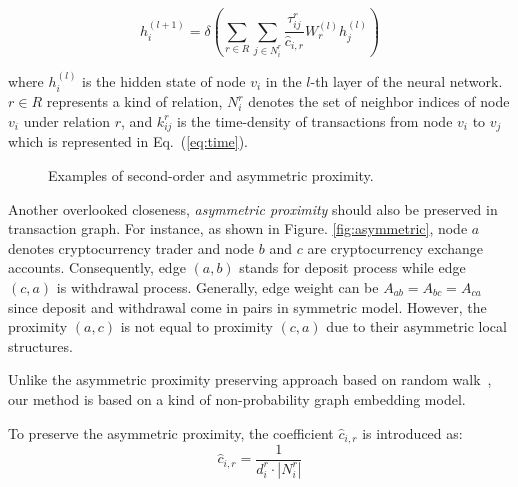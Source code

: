 \begin{equation}
h_i^{(l+1)}=\delta(\sum_{r\in R} \sum_{j \in N_i^r} \frac{\tau_{ij}^r}{\hat c_{i,r}}W_r^{(l)}h_j^{(l)})
\end{equation}

\noindent where $h_i^{(l)}$ is the hidden state of node $v_i$ in the $l$-th layer of the neural network. $r \in R$ represents a kind of relation, $N_i^r$ denotes the set of neighbor indices of node $v_i$ under relation $r$, and $k_{ij}^r$ is the time-density of transactions from node $v_i$ to $v_j$ which is represented in Eq.~(\ref{eq:time}).



\begin{figure}[htbp]
	\centering
	\caption{Examples of second-order and asymmetric proximity.}

\end{figure}


Another overlooked closeness, \emph{asymmetric proximity} should also be preserved in transaction graph. For instance, as shown in Figure. \ref{fig:asymmetric}, node $a$ denotes cryptocurrency trader and node $b$ and $c$ are cryptocurrency exchange accounts. Consequently, edge $(a,b)$ stands for deposit process while edge $(c,a)$ is withdrawal process. Generally, edge weight can be $A_{ab}=A_{bc}=A_{ca}$ since deposit and withdrawal come in pairs in symmetric model. However, the proximity $(a,c)$ is not equal to proximity $(c,a)$ due to their asymmetric local structures.

Unlike the asymmetric proximity preserving approach based on random walk~\cite{zhou2017scalable}, our method is based on a kind of non-probability graph embedding model.
 
To preserve the asymmetric proximity, the coefficient $\hat c_{i,r}$ is introduced as:
\begin{equation}
\hat c_{i,r}=\frac{1}{d_i^r\cdot |N_i^r|}
\end{equation}

